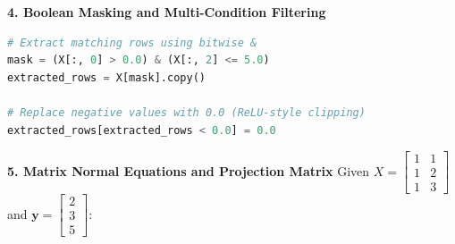 \textbf{4. Boolean Masking and Multi-Condition Filtering}
\begin{lstlisting}[language=Python]
# Extract matching rows using bitwise &
mask = (X[:, 0] > 0.0) & (X[:, 2] <= 5.0)
extracted_rows = X[mask].copy()

# Replace negative values with 0.0 (ReLU-style clipping)
extracted_rows[extracted_rows < 0.0] = 0.0
\end{lstlisting}

\textbf{5. Matrix Normal Equations and Projection Matrix}
Given $X = \begin{bmatrix} 1 & 1 \\ 1 & 2 \\ 1 & 3 \end{bmatrix}$ and $\mathbf{y} = \begin{bmatrix} 2 \\ 3 \\ 5 \end{bmatrix}$:
